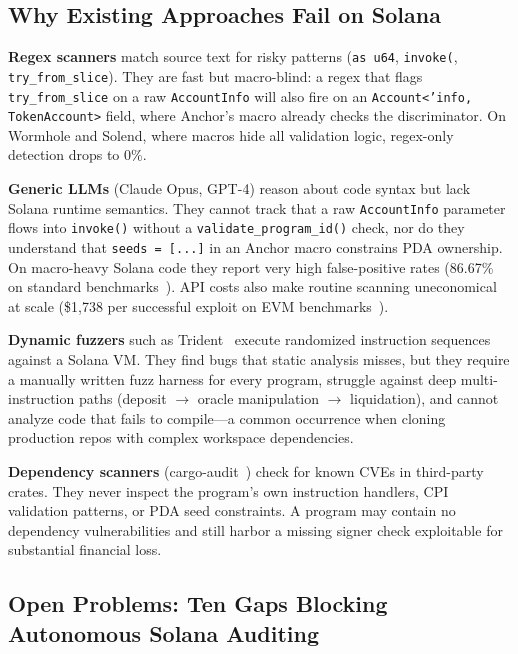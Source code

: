\documentclass{article}
\begin{document}
\subsection{Why Existing Approaches Fail on Solana}

\textbf{Regex scanners} match source text for risky patterns (\texttt{as u64}, \texttt{invoke(}, \texttt{try\_from\_slice}). They are fast but macro-blind: a regex that flags \texttt{try\_from\_slice} on a raw \texttt{AccountInfo} will also fire on an \texttt{Account<'info, TokenAccount>} field, where Anchor's macro already checks the discriminator. On Wormhole and Solend, where macros hide all validation logic, regex-only detection drops to 0\%.

\textbf{Generic LLMs} (Claude Opus, GPT-4) reason about code syntax but lack Solana runtime semantics. They cannot track that a raw \texttt{AccountInfo} parameter flows into \texttt{invoke()} without a \texttt{validate\_program\_id()} check, nor do they understand that \texttt{seeds = [...]} in an Anchor macro constrains PDA ownership. On macro-heavy Solana code they report very high false-positive rates (86.67\% on standard benchmarks~\citep{ackee2026trident_arena}). API costs also make routine scanning uneconomical at scale (\$1,738 per successful exploit on EVM benchmarks~\citep{anthropic2025sconebench}).

\textbf{Dynamic fuzzers} such as Trident~\citep{ackee2026trident} execute randomized instruction sequences against a Solana VM. They find bugs that static analysis misses, but they require a manually written fuzz harness for every program, struggle against deep multi-instruction paths (deposit $\to$ oracle manipulation $\to$ liquidation), and cannot analyze code that fails to compile---a common occurrence when cloning production repos with complex workspace dependencies.

\textbf{Dependency scanners} (cargo-audit~\citep{trailofbits2026cargo_audit}) check for known CVEs in third-party crates. They never inspect the program's own instruction handlers, CPI validation patterns, or PDA seed constraints. A program may contain no dependency vulnerabilities and still harbor a missing signer check exploitable for substantial financial loss.

\subsection{Open Problems: Ten Gaps Blocking Autonomous Solana Auditing}
\end{document}
